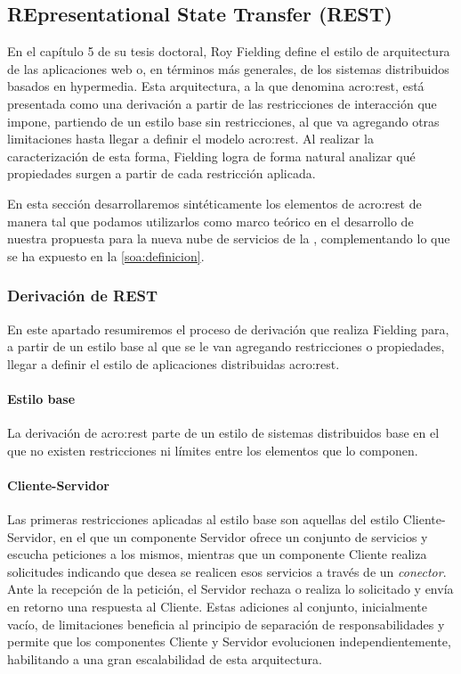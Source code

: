 \subsection{REpresentational State Transfer (REST)}
\label{standard:rest}

En el capítulo 5 de su tesis doctoral, Roy Fielding define el estilo de arquitectura de las aplicaciones web o, en términos más generales, de los sistemas distribuidos basados en hypermedia. Esta arquitectura, a la que denomina \gls{acro:rest}, está presentada como una derivación a partir de las restricciones de interacción que impone, partiendo de un estilo base sin restricciones, al que va agregando otras limitaciones hasta llegar a definir el modelo \gls{acro:rest}. Al realizar la caracterización de esta forma, Fielding logra de forma natural analizar qué propiedades surgen a partir de cada restricción aplicada.

En esta sección desarrollaremos sintéticamente los elementos de \gls{acro:rest} de manera tal que podamos utilizarlos como marco teórico en el desarrollo de nuestra propuesta para la nueva nube de servicios de la \unlp, complementando lo que se ha expuesto en la \autoref{soa:definicion}.


\subsubsection{Derivación de REST}
\label{standard:rest:derivacion}

En este apartado resumiremos el proceso de derivación que realiza Fielding para, a partir de un estilo base al que se le van agregando restricciones o propiedades, llegar a definir el estilo de aplicaciones distribuidas \gls{acro:rest}.

\paragraph{Estilo base}

La derivación de \gls{acro:rest} parte de un estilo de sistemas distribuidos base en el que no existen restricciones ni límites entre los elementos que lo componen.


\paragraph{Cliente-Servidor}

Las primeras restricciones aplicadas al estilo base son aquellas del estilo Cliente-Servidor\cite[Sec.~3.4.1]{tesis:fielding}, en el que un componente Servidor ofrece un conjunto de servicios y escucha peticiones a los mismos, mientras que un componente Cliente realiza solicitudes indicando que desea se realicen esos servicios a través de un \textit{conector}. Ante la recepción de la petición, el Servidor rechaza o realiza lo solicitado y envía en retorno una respuesta al Cliente.
Estas adiciones al conjunto, inicialmente vacío, de limitaciones beneficia al principio de separación de responsabilidades y permite que los componentes Cliente y Servidor evolucionen independientemente, habilitando a una gran escalabilidad de esta arquitectura.


